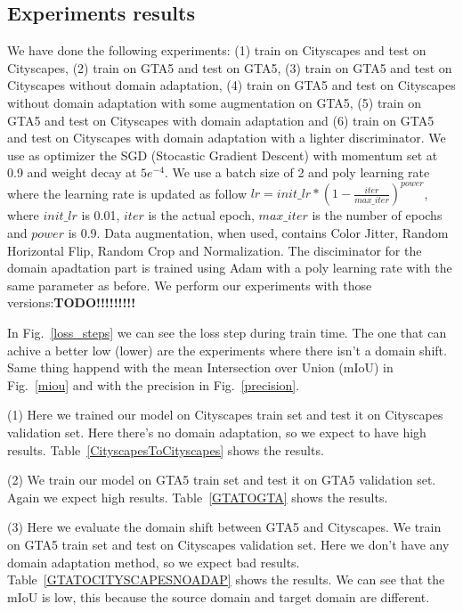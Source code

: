 \documentclass[conference]{IEEEtran}
\begin{document}
\subsection{Experiments results}

We have done the following experiments: (1) train on Cityscapes and test on Cityscapes, (2) train on GTA5 and test on GTA5, (3) train on 
GTA5 and test on Cityscapes without domain adaptation, (4) train on GTA5 and test on Cityscapes without domain adaptation with some
augmentation on GTA5, (5) train on GTA5 and test on Cityscapes with domain adaptation and (6) train on GTA5 and test on Cityscapes with
domain adaptation with a lighter discriminator. 
We use as optimizer the SGD (Stocastic Gradient Descent) with momentum set at 0.9 and weight decay at \(5e^{-4}\). We use a batch size of 
2 and poly learning rate where the learning rate is updated as follow \(lr = init\_lr * (1 - \frac{iter}{max\_iter})^{power}\), where
\(init\_lr\) is 0.01, \(iter\) is the actual epoch, \(max\_iter\) is the number of epochs and \(power\) is 0.9. Data augmentation, when
used, contains Color Jitter, Random Horizontal Flip, Random Crop and Normalization. The disciminator for the domain apadtation part
is trained using Adam with a poly learning rate with the same parameter as before. 
We perform our experiments with those versions:\textbf{TODO!!!!!!!!!}

In Fig.~\ref{loss_steps} we can see the loss step during train time. The one that can achive a better low (lower) are the experiments
where there isn't a domain shift. Same thing happend with the mean Intersection over Union (mIoU) in Fig.~\ref{miou} and with the
precision in Fig.~\ref{precision}. 

(1) Here we trained our model on Cityscapes train set and test it on Cityscapes validation set. Here there's no domain adaptation, so
we expect to have high results. Table~\ref{CityscapesToCityscapes} shows the results.

(2) We train our model on GTA5 train set and test it on GTA5 validation set. Again we expect high results.  
Table~\ref{GTATOGTA} shows the results.

(3) Here we evaluate the domain shift between GTA5 and Cityscapes. We train on GTA5 train set and test on Cityscapes validation set.
Here we don't have any domain adaptation method, so we expect bad results. Table~\ref{GTATOCITYSCAPESNOADAP} shows the results. We can 
see that the mIoU is low, this because the source domain and target domain are different. 
\end{document}
